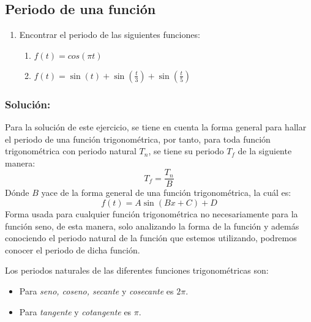 





\begin{multicols}{2}

\section{Periodo de una función}

\begin{enumerate}
    \item Encontrar el periodo de las siguientes funciones:
    \begin{enumerate}
        \item $f(t) = cos \left(\pi t\right)$ 
        \item $f(t) = \sin \left(t\right) + \sin \left(\frac{t}{3}\right) + \sin \left(\frac{t}{5}\right)$
    \end{enumerate} 
\end{enumerate}

\subsubsection*{\textbf{Solución:} }


Para la solución de este ejercicio, se tiene en cuenta la forma general para hallar el periodo de una función trigonométrica, por tanto, para toda función trigonométrica con periodo natural $T_n$, se tiene su periodo $T_f$ de la siguiente manera:
\begin{equation}
    T_f = \frac{T_n}{B}
\label{eq1}
\end{equation}
Dónde $B$ yace de la forma general de una función trigonométrica, la cuál es:
\begin{equation*}
    f(t) = A\sin\left(Bx + C\right) + D
\end{equation*}
Forma usada para cualquier función trigonométrica no necesariamente para la función seno, de esta manera, solo analizando la forma de la función y además conociendo el periodo natural de la función que estemos utilizando, podremos conocer el periodo de dicha función.

Los periodos naturales de las diferentes funciones trigonométricas son:

\begin{itemize}
    \item Para \textit{seno, coseno, secante} y \textit{cosecante} es $2\pi$.
    \item Para \textit{tangente} y \textit{cotangente} es $\pi$.
\end{itemize}


\end{multicols}
